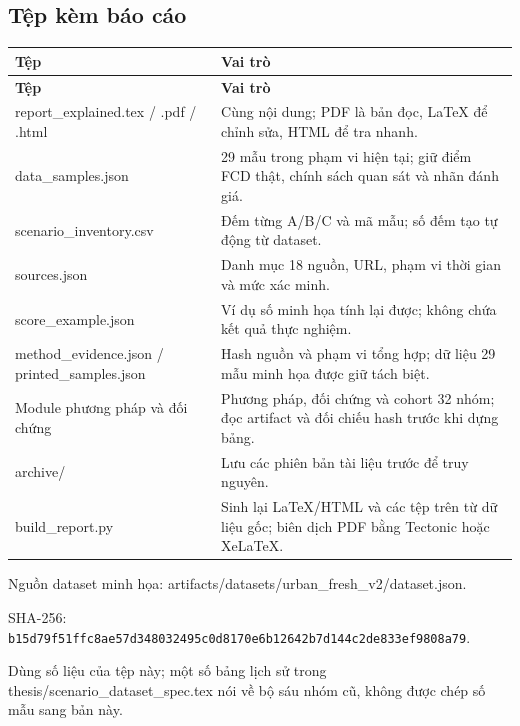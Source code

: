 \documentclass[10pt,a4paper]{article}
\begin{document}
\subsection{Tệp kèm báo cáo}
\begingroup\small
\begin{longtable}{@{}P{5.306cm}P{11.613cm}@{}}
\toprule
\textbf{Tệp} & \textbf{Vai trò}\\\midrule
\endfirsthead
\toprule
\textbf{Tệp} & \textbf{Vai trò}\\\midrule
\endhead
\bottomrule\endfoot
report\_\allowbreak{}explained.tex / .pdf / .html & Cùng nội dung; PDF là bản đọc, LaTeX để chỉnh sửa, HTML để tra nhanh.\\
\addlinespace[3pt]
data\_\allowbreak{}samples.json & 29 mẫu trong phạm vi hiện tại; giữ điểm FCD thật, chính sách quan sát và nhãn đánh giá.\\
\addlinespace[3pt]
scenario\_\allowbreak{}inventory.csv & Đếm từng A/B/C và mã mẫu; số đếm tạo tự động từ dataset.\\
\addlinespace[3pt]
sources.json & Danh mục 18 nguồn, URL, phạm vi thời gian và mức xác minh.\\
\addlinespace[3pt]
score\_\allowbreak{}example.json & Ví dụ số minh họa tính lại được; không chứa kết quả thực nghiệm.\\
\addlinespace[3pt]
method\_\allowbreak{}evidence.json / printed\_\allowbreak{}samples.json & Hash nguồn và phạm vi tổng hợp; dữ liệu 29 mẫu minh họa được giữ tách biệt.\\
\addlinespace[3pt]
Module phương pháp và đối chứng & Phương pháp, đối chứng và cohort 32 nhóm; đọc artifact và đối chiếu hash trước khi dựng bảng.\\
\addlinespace[3pt]
archive/ & Lưu các phiên bản tài liệu trước để truy nguyên.\\
\addlinespace[3pt]
build\_\allowbreak{}report.py & Sinh lại LaTeX/HTML và các tệp trên từ dữ liệu gốc; biên dịch PDF bằng Tectonic hoặc XeLaTeX.\\
\end{longtable}
\endgroup
Nguồn dataset minh họa: artifacts/datasets/urban\_\allowbreak{}fresh\_\allowbreak{}v2/dataset.json.

SHA-256: \texttt{b15d79f5\allowbreak{}1ffc8ae5\allowbreak{}7d348032\allowbreak{}495c0d81\allowbreak{}70e6b126\allowbreak{}42b7d144\allowbreak{}c2de833e\allowbreak{}f9808a79}.

Dùng số liệu của tệp này; một số bảng lịch sử trong thesis/scenario\_\allowbreak{}dataset\_\allowbreak{}spec.tex nói về bộ sáu nhóm cũ, không được chép số mẫu sang bản này.
\end{document}
